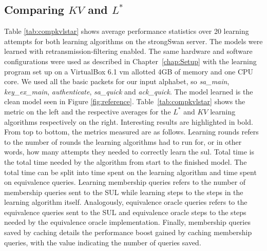 \subsection{Comparing $KV$ and $L^*$} \label{subsec:comp_kv_lstar}
Table \ref{tab:compkvlstar} shows average performance statistics over 20 learning attempts for both learning algorithms on the strongSwan server. The models were learned with retransmission-filtering enabled. The same hardware and software configurations were used as described in Chapter~\ref{chap:Setup} with the learning program set up on a VirtualBox 6.1 \ac{vm} allotted 4GB of memory and one CPU core. We used all the basic packets for our input alphabet, so
\emph{sa\_main}, \emph{key\_ex\_main}, \emph{authenticate}, \emph{sa\_quick} and \emph{ack\_quick}. The model learned is the clean model seen in Figure \ref{fig:reference}. Table~\ref{tab:compkvlstar} shows the metric on the left and the respective averages for the $L^*$ and $KV$ learning algorithms respectively on the right. Interesting results are highlighted in bold. From top to bottom, the metrics measured are as follows. Learning rounds refers to the number of rounds the learning algorithms had to run for, or in other words, how many attempts they needed to correctly learn the \ac{sul}. Total time is the total time needed by the algorithm from start to the finished model. The total time can be split into time spent on the learning algorithm and time spent on equivalence queries. Learning membership queries refers to the number of membership queries sent to the SUL while learning steps to the steps in the learning algorithm itself. Analogously, equivalence oracle queries refers to the equivalence queries sent to the SUL and equivalence oracle steps to the steps needed by the equivalence oracle implementation. Finally, membership queries saved by caching details the performance boost gained by caching membership queries, with the value indicating the number of queries saved.

